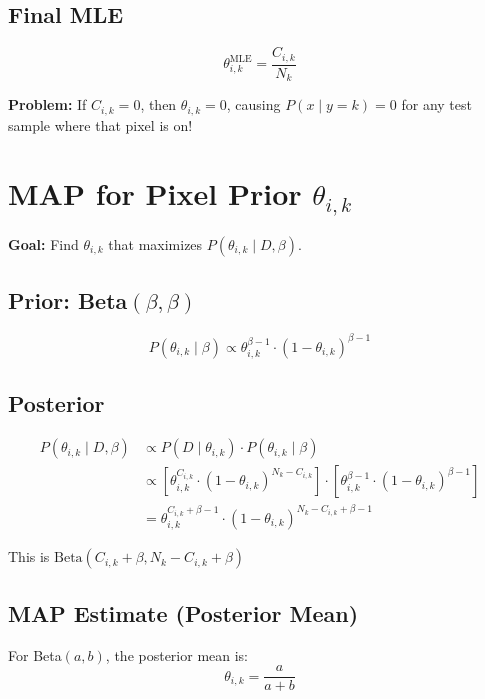 \documentclass[11pt]{article}
\begin{document}
\subsection{Final MLE}
\begin{equation}
\boxed{\theta_{i,k}^{\text{MLE}} = \frac{C_{i,k}}{N_k}}
\end{equation}

\textbf{Problem:} If $C_{i,k} = 0$, then $\theta_{i,k} = 0$, causing $P(x \mid y=k) = 0$ for any test sample where that pixel is on!

\section{MAP for Pixel Prior $\theta_{i,k}$}

\textbf{Goal:} Find $\theta_{i,k}$ that maximizes $P(\theta_{i,k} \mid D, \beta)$.

\subsection{Prior: Beta$(\beta, \beta)$}
\begin{equation}
P(\theta_{i,k} \mid \beta) \propto \theta_{i,k}^{\beta-1} \cdot (1 - \theta_{i,k})^{\beta-1}
\end{equation}

\subsection{Posterior}
\begin{align}
P(\theta_{i,k} \mid D, \beta) &\propto P(D \mid \theta_{i,k}) \cdot P(\theta_{i,k} \mid \beta) \\
&\propto \left[\theta_{i,k}^{C_{i,k}} \cdot (1-\theta_{i,k})^{N_k - C_{i,k}}\right] \cdot \left[\theta_{i,k}^{\beta-1} \cdot (1-\theta_{i,k})^{\beta-1}\right] \\
&= \theta_{i,k}^{C_{i,k} + \beta - 1} \cdot (1-\theta_{i,k})^{N_k - C_{i,k} + \beta - 1}
\end{align}

This is $\text{Beta}(C_{i,k} + \beta, N_k - C_{i,k} + \beta)$

\subsection{MAP Estimate (Posterior Mean)}
For Beta$(a, b)$, the posterior mean is:
\begin{equation}
\theta_{i,k} = \frac{a}{a + b}
\end{equation}
\end{document}
